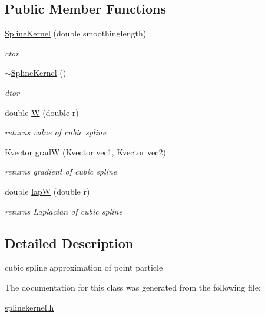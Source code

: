 \subsection*{\-Public \-Member \-Functions}
\begin{DoxyCompactItemize}
\item 
\hypertarget{classSplineKernel_a5b2e456001025775c0912f43d5fae88c}{\hyperlink{classSplineKernel_a5b2e456001025775c0912f43d5fae88c}{\-Spline\-Kernel} (double smoothinglength)}\label{classSplineKernel_a5b2e456001025775c0912f43d5fae88c}

\begin{DoxyCompactList}\small\item\em ctor \end{DoxyCompactList}\item 
\hypertarget{classSplineKernel_ab88c7d460702f581c87817c82fe792d2}{\hyperlink{classSplineKernel_ab88c7d460702f581c87817c82fe792d2}{$\sim$\-Spline\-Kernel} ()}\label{classSplineKernel_ab88c7d460702f581c87817c82fe792d2}

\begin{DoxyCompactList}\small\item\em dtor \end{DoxyCompactList}\item 
\hypertarget{classSplineKernel_a8dd3d968b0436c799789da0777398151}{double \hyperlink{classSplineKernel_a8dd3d968b0436c799789da0777398151}{\-W} (double r)}\label{classSplineKernel_a8dd3d968b0436c799789da0777398151}

\begin{DoxyCompactList}\small\item\em returns value of cubic spline \end{DoxyCompactList}\item 
\hypertarget{classSplineKernel_a67e539f362309f2c196a186e565da62b}{\hyperlink{structKvector}{\-Kvector} \hyperlink{classSplineKernel_a67e539f362309f2c196a186e565da62b}{grad\-W} (\hyperlink{structKvector}{\-Kvector} vec1, \hyperlink{structKvector}{\-Kvector} vec2)}\label{classSplineKernel_a67e539f362309f2c196a186e565da62b}

\begin{DoxyCompactList}\small\item\em returns gradient of cubic spline \end{DoxyCompactList}\item 
\hypertarget{classSplineKernel_a51a02339e02aa47138e8a4b0e5bed5cc}{double \hyperlink{classSplineKernel_a51a02339e02aa47138e8a4b0e5bed5cc}{lap\-W} (double r)}\label{classSplineKernel_a51a02339e02aa47138e8a4b0e5bed5cc}

\begin{DoxyCompactList}\small\item\em returns \-Laplacian of cubic spline \end{DoxyCompactList}\end{DoxyCompactItemize}


\subsection{\-Detailed \-Description}
cubic spline approximation of point particle 

\-The documentation for this class was generated from the following file\-:\begin{DoxyCompactItemize}
\item 
\hyperlink{splinekernel_8h}{splinekernel.\-h}\end{DoxyCompactItemize}
